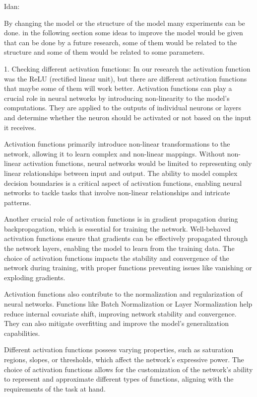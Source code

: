 \documentclass[a4paper]{article}
\begin{document}
Idan:

By changing the model or the structure of the model many experiments can be done. in the following section some ideas to improve the model would be given that can be done by a future research, some of them would be related to the structure and some of them would be related to some parameters.

1. Checking different activation functions: In our research the activation function was the ReLU (rectified linear unit), but there are different activation functions that maybe some of them will work better. Activation functions can play a crucial role in neural networks by introducing non-linearity to the model's computations. They are applied to the outputs of individual neurons or layers and determine whether the neuron should be activated or not based on the input it receives.

Activation functions primarily introduce non-linear transformations to the network, allowing it to learn complex and non-linear mappings. Without non-linear activation functions, neural networks would be limited to representing only linear relationships between input and output. The ability to model complex decision boundaries is a critical aspect of activation functions, enabling neural networks to tackle tasks that involve non-linear relationships and intricate patterns.

Another crucial role of activation functions is in gradient propagation during backpropagation, which is essential for training the network. Well-behaved activation functions ensure that gradients can be effectively propagated through the network layers, enabling the model to learn from the training data. The choice of activation functions impacts the stability and convergence of the network during training, with proper functions preventing issues like vanishing or exploding gradients.

Activation functions also contribute to the normalization and regularization of neural networks. Functions like Batch Normalization or Layer Normalization help reduce internal covariate shift, improving network stability and convergence. They can also mitigate overfitting and improve the model's generalization capabilities.

Different activation functions possess varying properties, such as saturation regions, slopes, or thresholds, which affect the network's expressive power. The choice of activation functions allows for the customization of the network's ability to represent and approximate different types of functions, aligning with the requirements of the task at hand.
\end{document}
